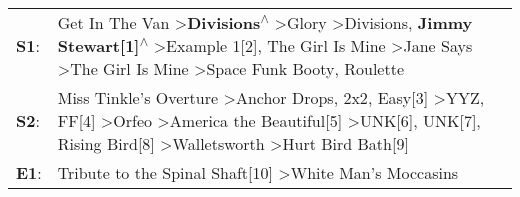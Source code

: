\begin{supertabular}{p{0.03\textwidth}p{0.92\textwidth}}
 \textbf{S1}:  &                                Get In The Van\textsuperscript{} \textgreater \enspace \textbf{Divisions\textsuperscript{$\wedge$}} \textgreater \enspace Glory\textsuperscript{} \textgreater \enspace Divisions\textsuperscript{}, \enspace \textbf{Jimmy Stewart[1]\textsuperscript{$\wedge$}} \textgreater \enspace Example 1[2]\textsuperscript{}, \enspace The Girl Is Mine\textsuperscript{} \textgreater \enspace Jane Says\textsuperscript{} \textgreater \enspace The Girl Is Mine\textsuperscript{} \textgreater \enspace Space Funk Booty\textsuperscript{}, \enspace Roulette\textsuperscript{}  \enspace  \\
 \textbf{S2}:  &  Miss Tinkle's Overture\textsuperscript{} \textgreater \enspace Anchor Drops\textsuperscript{}, \enspace 2x2\textsuperscript{}, \enspace Easy[3]\textsuperscript{} \textgreater \enspace YYZ\textsuperscript{}, \enspace FF[4]\textsuperscript{} \textgreater \enspace Orfeo\textsuperscript{} \textgreater \enspace America the Beautiful[5]\textsuperscript{} \textgreater \enspace UNK[6]\textsuperscript{}, \enspace UNK[7]\textsuperscript{}, \enspace Rising Bird[8]\textsuperscript{} \textgreater \enspace Walletsworth\textsuperscript{} \textgreater \enspace Hurt Bird Bath[9]\textsuperscript{}  \enspace  \\
 \textbf{E1}:  &                                                                                                                                                                                                                                                                                                                                                                                                                                                                                             Tribute to the Spinal Shaft[10]\textsuperscript{} \textgreater \enspace White Man's Moccasins\textsuperscript{}  \enspace  \\
\end{supertabular}
